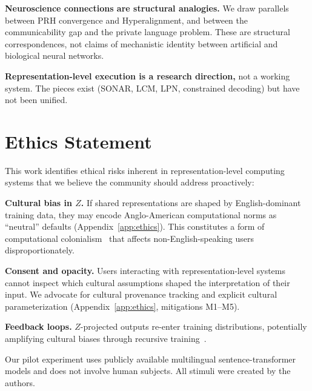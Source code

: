 \documentclass[11pt]{article}
\theoremstyle{definition}
\begin{document}
\textbf{Neuroscience connections are structural analogies.} We draw parallels between PRH convergence and Hyperalignment, and between the communicability gap and the private language problem. These are structural correspondences, not claims of mechanistic identity between artificial and biological neural networks.

\textbf{Representation-level execution is a research direction,} not a working system. The pieces exist (SONAR, LCM, LPN, constrained decoding) but have not been unified.


\section*{Ethics Statement}

This work identifies ethical risks inherent in representation-level computing systems that we believe the community should address proactively:

\textbf{Cultural bias in $Z$.} If shared representations are shaped by English-dominant training data, they may encode Anglo-American computational norms as ``neutral'' defaults (Appendix~\ref{app:ethics}). This constitutes a form of computational colonialism~\cite{phillipson1992} that affects non-English-speaking users disproportionately.

\textbf{Consent and opacity.} Users interacting with representation-level systems cannot inspect which cultural assumptions shaped the interpretation of their input. We advocate for cultural provenance tracking and explicit cultural parameterization (Appendix~\ref{app:ethics}, mitigations M1--M5).

\textbf{Feedback loops.} $Z$-projected outputs re-enter training distributions, potentially amplifying cultural biases through recursive training~\cite{shumailov2024collapse}.

Our pilot experiment uses publicly available multilingual sentence-transformer models and does not involve human subjects. All stimuli were created by the authors.



\end{document}
